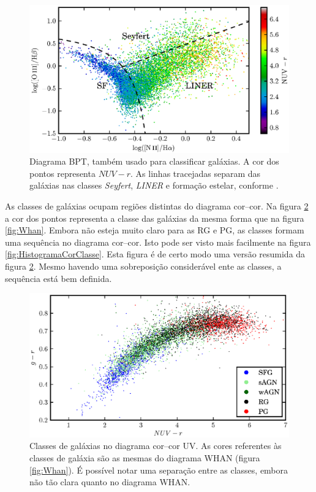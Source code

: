 \begin{figure}
	\includegraphics{figuras/bpt-uv.eps}
	\caption[Cores ultravioleta no diagrama BPT.]
	{Diagrama BPT, também usado para classificar galáxias. A cor dos
	pontos representa $NUV-r$. As linhas tracejadas separam das galáxias nas
	classes {\em Seyfert}, {\em LINER} e formação estelar, conforme
	\citet[linhas S06 e K06 da tabela 1]{CidFernandes2010}.}
	\label{fig:BPTUV}
\end{figure}

As classes de galáxias ocupam regiões distintas do diagrama cor--cor. Na figura
\ref{fig:ColorClass} a cor dos pontos representa a classe das galáxias da mesma
forma que na figura \ref{fig:Whan}. Embora não esteja muito claro para as RG e
PG, as classes formam uma sequência no diagrama cor--cor. Isto pode ser visto
mais facilmente na figura \ref{fig:HistogramaCorClasse}. Esta figura é de certo
modo uma versão resumida da figura \ref{fig:ColorClass}. Mesmo havendo uma
sobreposição considerável ente as classes, a sequência está bem definida.

\begin{figure}
	\includegraphics{figuras/uvcolor-color-class.eps}
	\caption[Diagrama cor--cor UV de acordo com o tipo de galáxia.]
	{Classes de galáxias no diagrama cor--cor UV. As cores referentes às classes de
	galáxia são as mesmas do diagrama WHAN (figura \ref{fig:Whan}). É possível
	notar uma separação entre as classes, embora não tão clara quanto no diagrama
	WHAN.}
	\label{fig:ColorClass}
\end{figure}

